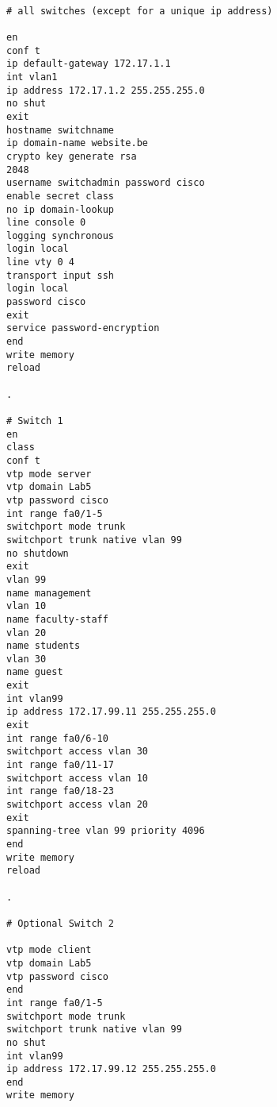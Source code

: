 \begin{Verbatim}[frame=topline, framesep=4mm, label=\fbox{Switch Commands}]

# all switches (except for a unique ip address)

en
conf t
ip default-gateway 172.17.1.1
int vlan1
ip address 172.17.1.2 255.255.255.0
no shut
exit
hostname switchname
ip domain-name website.be
crypto key generate rsa
2048
username switchadmin password cisco
enable secret class
no ip domain-lookup
line console 0
logging synchronous
login local
line vty 0 4
transport input ssh
login local
password cisco
exit
service password-encryption
end
write memory
reload

.

# Switch 1
en
class
conf t
vtp mode server
vtp domain Lab5
vtp password cisco
int range fa0/1-5
switchport mode trunk
switchport trunk native vlan 99
no shutdown
exit
vlan 99
name management
vlan 10
name faculty-staff
vlan 20
name students
vlan 30
name guest
exit
int vlan99
ip address 172.17.99.11 255.255.255.0
exit
int range fa0/6-10
switchport access vlan 30
int range fa0/11-17
switchport access vlan 10
int range fa0/18-23
switchport access vlan 20
exit
spanning-tree vlan 99 priority 4096
end
write memory
reload

.

# Optional Switch 2

vtp mode client
vtp domain Lab5
vtp password cisco
end
int range fa0/1-5
switchport mode trunk
switchport trunk native vlan 99
no shut
int vlan99
ip address 172.17.99.12 255.255.255.0
end
write memory

\end{Verbatim}
